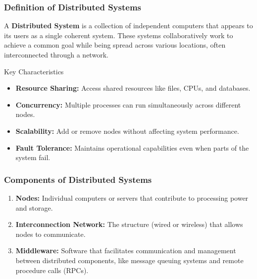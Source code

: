 \documentclass{beamer}
\begin{document}
\begin{frame}[fragile]
    \frametitle{Definition of Distributed Systems}
    A \textbf{Distributed System} is a collection of independent computers that appears to its users as a single coherent system. 
    These systems collaboratively work to achieve a common goal while being spread across various locations, often interconnected through a network.
    
    \begin{block}{Key Characteristics}
        \begin{itemize}
            \item \textbf{Resource Sharing:} Access shared resources like files, CPUs, and databases.
            \item \textbf{Concurrency:} Multiple processes can run simultaneously across different nodes.
            \item \textbf{Scalability:} Add or remove nodes without affecting system performance.
            \item \textbf{Fault Tolerance:} Maintains operational capabilities even when parts of the system fail.
        \end{itemize}
    \end{block}
\end{frame}

\begin{frame}[fragile]
    \frametitle{Components of Distributed Systems}
    \begin{enumerate}
        \item \textbf{Nodes:} Individual computers or servers that contribute to processing power and storage.
        \item \textbf{Interconnection Network:} The structure (wired or wireless) that allows nodes to communicate.
        \item \textbf{Middleware:} Software that facilitates communication and management between distributed components, like message queuing systems and remote procedure calls (RPCs).
    \end{enumerate}
\end{frame}
\end{document}

